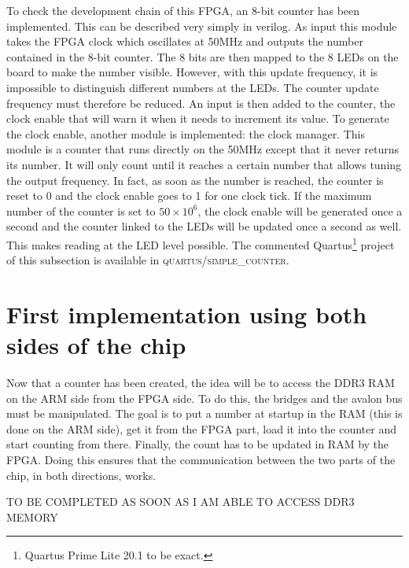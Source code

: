 \documentclass[12pt]{article}
\begin{document}
To check the development chain of this FPGA, an 8-bit counter has been implemented. This can be described very simply in verilog. As input this module takes the FPGA clock which oscillates at 50MHz and outputs the number contained in the 8-bit counter. The 8 bits are then mapped to the 8 LEDs on the board to make the number visible. However, with this update frequency, it is impossible to distinguish different numbers at the LEDs. The counter update frequency must therefore be reduced. An input is then added to the counter, the clock enable that will warn it when it needs to increment its value. To generate the clock enable, another module is implemented: the clock manager. This module is a counter that runs directly on the 50MHz except that it never returns its number. It will only count until it reaches a certain number that allows tuning the output frequency. In fact, as soon as the number is reached, the counter is reset to 0 and the clock enable goes to 1 for one clock tick. If the maximum number of the counter is set to $50 \times 10^6$, the clock enable will be generated once a second and the counter linked to the LEDs will be updated once a second as well. This makes reading at the LED level possible. The commented Quartus\footnote{Quartus Prime Lite 20.1 to be exact.} project of this subsection is available in \textsc{quartus/simple\_counter}.

\section{First implementation using both sides of the chip}

Now that a counter has been created, the idea will be to access the DDR3 RAM on the ARM side from the FPGA side. To do this, the bridges and the avalon bus must be manipulated. The goal is to put a number at startup in the RAM (this is done on the ARM side), get it from the FPGA part, load it into the counter and start counting from there. Finally, the count has to be updated in RAM by the FPGA. Doing this ensures that the communication between the two parts of the chip, in both directions, works.

\vspace{12pt}
TO BE COMPLETED AS SOON AS I AM ABLE TO ACCESS DDR3 MEMORY
\end{document}
